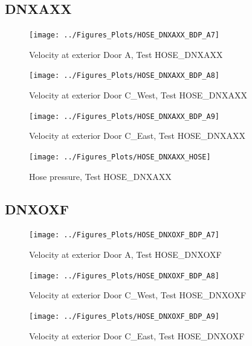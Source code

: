 \documentclass[11pt,oneside]{book}
\begin{document}
\subsection{DNXAXX}

\begin{figure}[!ht]
\texttt{[image: ../Figures\_Plots/HOSE\_DNXAXX\_BDP\_A7]}
\caption{Velocity at exterior Door A, Test HOSE\_DNXAXX}
\label{fig:HOSE_DNXAXX_BDP_A7}
\end{figure}

\begin{figure}[!ht]
\texttt{[image: ../Figures\_Plots/HOSE\_DNXAXX\_BDP\_A8]}
\caption{Velocity at exterior Door C\_West, Test HOSE\_DNXAXX}
\label{fig:HOSE_DNXAXX_BDP_A8}
\end{figure}

\begin{figure}[!ht]
\texttt{[image: ../Figures\_Plots/HOSE\_DNXAXX\_BDP\_A9]}
\caption{Velocity at exterior Door C\_East, Test HOSE\_DNXAXX}
\label{fig:HOSE_DNXAXX_BDP_A9}
\end{figure}

\begin{figure}[!ht]
\texttt{[image: ../Figures\_Plots/HOSE\_DNXAXX\_HOSE]}
\caption{Hose pressure, Test HOSE\_DNXAXX}
\label{fig:HOSE_DNXAXX_HOSE}
\end{figure}


\clearpage


\subsection{DNXOXF}

\begin{figure}[!ht]
\texttt{[image: ../Figures\_Plots/HOSE\_DNXOXF\_BDP\_A7]}
\caption{Velocity at exterior Door A, Test HOSE\_DNXOXF}
\label{fig:HOSE_DNXOXF_BDP_A7}
\end{figure}

\begin{figure}[!ht]
\texttt{[image: ../Figures\_Plots/HOSE\_DNXOXF\_BDP\_A8]}
\caption{Velocity at exterior Door C\_West, Test HOSE\_DNXOXF}
\label{fig:HOSE_DNXOXF_BDP_A8}
\end{figure}

\begin{figure}[!ht]
\texttt{[image: ../Figures\_Plots/HOSE\_DNXOXF\_BDP\_A9]}
\caption{Velocity at exterior Door C\_East, Test HOSE\_DNXOXF}
\label{fig:HOSE_DNXOXF_BDP_A9}
\end{figure}
\end{document}
